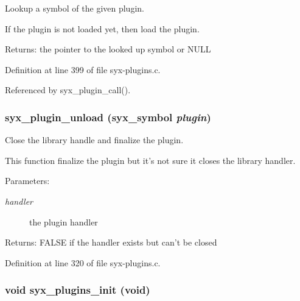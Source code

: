 Lookup a symbol of the given plugin.

If the plugin is not loaded yet, then load the plugin.

\begin{Desc}
\item[Returns:]the pointer to the looked up symbol or NULL \end{Desc}


Definition at line 399 of file syx-plugins.c.

Referenced by syx\_\-plugin\_\-call().\hypertarget{syx-plugins_8c_93dae14d03f2f02c702c84e3a516b9c9}{
\subsubsection{ syx\_\-plugin\_\-unload ({\bf syx\_\-symbol} {\em plugin})}}
\label{syx-plugins_8c_93dae14d03f2f02c702c84e3a516b9c9}


Close the library handle and finalize the plugin.

This function finalize the plugin but it's not sure it closes the library handler.

\begin{Desc}
\item[Parameters:]
\begin{description}
\item[{\em handler}]the plugin handler \end{description}
\end{Desc}
\begin{Desc}
\item[Returns:]FALSE if the handler exists but can't be closed \end{Desc}


Definition at line 320 of file syx-plugins.c.\hypertarget{syx-plugins_8c_50f74dbc73f9dd07eed9abdc542f599f}{
\subsubsection{\setlength{\rightskip}{0pt plus 5cm}void syx\_\-plugins\_\-init (void)}}
\label{syx-plugins_8c_50f74dbc73f9dd07eed9abdc542f599f}


